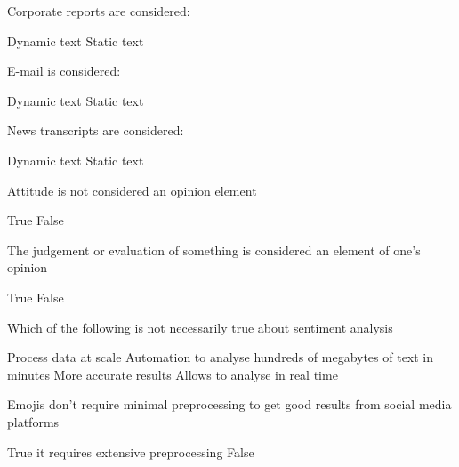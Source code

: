 \documentclass[theme=sleek, randomorder, hidesidemenu]{webquiz}
\begin{document}
\begin{question}
  Corporate reports are considered:
  \begin{choice}
    \incorrect Dynamic text
    \correct Static text
  \end{choice}
\end{question}

\begin{question}
  E-mail is considered:
  \begin{choice}
    \incorrect Dynamic text
    \correct Static text
  \end{choice}

\end{question}

\begin{question}
  News transcripts are considered:
  \begin{choice}
    \incorrect Dynamic text
    \correct Static text
  \end{choice}
\end{question}

\begin{question}
  Attitude is not considered an opinion element
  \begin{choice}
    \incorrect True
    \correct False
  \end{choice}
\end{question}

\begin{question}
  The judgement or evaluation of something is considered an element of one's opinion
  \begin{choice}
    \correct True
    \incorrect False
  \end{choice}
\end{question}

\begin{question}
  Which of the following is not necessarily true about sentiment analysis
  \begin{choice}
    \incorrect Process data at scale
    \incorrect Automation to analyse hundreds of megabytes of text in minutes
    \correct More accurate results
    \incorrect Allows to analyse in real time
  \end{choice}
\end{question}

\begin{question}
  Emojis don't require minimal preprocessing to get good results from social media platforms
  \begin{choice}
    \incorrect True \feedback it requires extensive preprocessing
    \correct False
  \end{choice}
\end{question}
\end{document}
